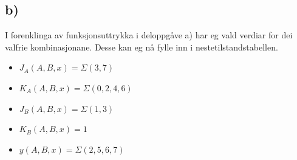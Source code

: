 \documentclass[12pt,a4paper]{article}
\begin{document}
    \subsection{b)}
      I forenklinga av funksjonsuttrykka i deloppgåve a) har eg vald verdiar
      for dei valfrie kombinasjonane. Desse kan eg nå fylle inn i
      nestetilstandstabellen.
      \begin{itemize}
        \item $J_A(A,B,x) = \Sigma(3,7)$
        \item $K_A(A,B,x) = \Sigma(0,2,4,6)$
        \item $J_B(A,B,x) = \Sigma(1,3)$
        \item $K_B(A,B,x) = 1$
        \item $y(A,B,x) = \Sigma(2,5,6,7)$
      \end{itemize}
      
\end{document}

